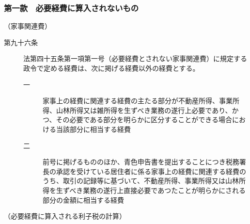 \documentclass[twocolumn,a4j,10pt]{ltjtarticle}
\begin{document}
\subsubsection*{第一款　必要経費に算入されないもの}
\noindent\hspace{10pt}（家事関連費）
\begin{description}
\item[第九十六条]法第四十五条第一項第一号（必要経費とされない家事関連費）に規定する政令で定める経費は、次に掲げる経費以外の経費とする。
\begin{description}
\item[一]家事上の経費に関連する経費の主たる部分が不動産所得、事業所得、山林所得又は雑所得を生ずべき業務の遂行上必要であり、かつ、その必要である部分を明らかに区分することができる場合における当該部分に相当する経費
\item[二]前号に掲げるもののほか、青色申告書を提出することにつき税務署長の承認を受けている居住者に係る家事上の経費に関連する経費のうち、取引の記録等に基づいて、不動産所得、事業所得又は山林所得を生ずべき業務の遂行上直接必要であつたことが明らかにされる部分の金額に相当する経費
\end{description}
\end{description}
\noindent\hspace{10pt}（必要経費に算入される利子税の計算）
\end{document}

